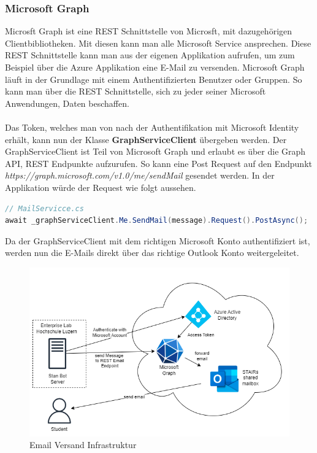 \documentclass[a4paper, table]{article}
\begin{document}
\subsubsection*{Microsoft Graph}
Microsft Graph ist eine REST Schnittstelle von Microsft, mit dazugehörigen Clientbibliotheken.
Mit diesen kann man alle Microsoft Service ansprechen. \autocite{}
Diese REST Schnittstelle kann man aus der eigenen Applikation aufrufen, um zum Beispiel über die Azure Applikation eine E-Mail zu versenden.
Microsoft Graph läuft in der Grundlage mit einem Authentifizierten Benutzer oder Gruppen.
So kann man über die REST Schnittstelle, sich zu jeder seiner Microsoft Anwendungen, Daten beschaffen.\\\\
Das Token, welches man von nach der Authentifikation mit Microsoft Identity erhält, kann nun der Klasse \textbf{GraphServiceClient} übergeben werden.
Der GraphServiceClient ist Teil von Microsoft Graph und erlaubt es über die Graph API, REST Endpunkte aufzurufen.
So kann eine Post Request auf den Endpunkt \textit{https://graph.microsoft.com/v1.0/me/sendMail} gesendet werden.
In der Applikation würde der Request wie folgt aussehen.

\begin{lstlisting}[language=csharp]
// MailServicce.cs
await _graphServiceClient.Me.SendMail(message).Request().PostAsync();
\end{lstlisting}

Da der GraphServiceClient mit dem richtigen Microsoft Konto authentifiziert ist, 
werden nun die E-Mails direkt über das richtige Outlook Konto weitergeleitet.

\begin{figure}[h]
    \centering
    \includegraphics[width=1\textwidth]{img/Email_Infrastruktur.png}
    \caption{Email Versand Infrastruktur}
    \label{fig:send-email-infrastructure}
\end{figure}
\end{document}
